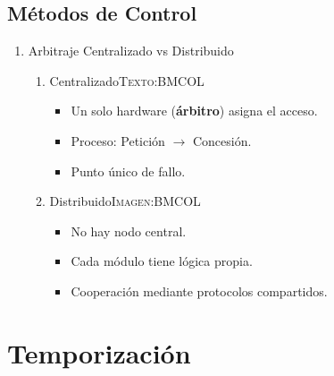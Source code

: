 \documentclass[presentation]{beamer}
\begin{document}
\subsection{Métodos de Control}
\label{sec:orgdbcdf7d}
\begin{enumerate}
\item Arbitraje Centralizado vs Distribuido
\label{sec:org28c27f7}
\begin{enumerate}
\item Centralizado\hfill{}\textsc{Texto:BMCOL}
\label{sec:orga4aebaa}
\begin{itemize}
\item Un solo hardware (\textbf{árbitro}) asigna el acceso.
\item Proceso: Petición \(\rightarrow\) Concesión.
\item Punto único de fallo.
\end{itemize}
\item Distribuido\hfill{}\textsc{Imagen:BMCOL}
\label{sec:org2473585}
\begin{itemize}
\item No hay nodo central.
\item Cada módulo tiene lógica propia.
\item Cooperación mediante protocolos compartidos.
\end{itemize}
\end{enumerate}
\end{enumerate}

\section{Temporización}
\label{sec:org170155f}
\end{document}
